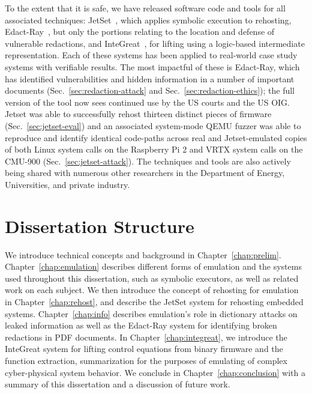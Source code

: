 To the extent that it is safe, we have released software code and tools for all associated techniques: JetSet~\cite{jetsetsource}, which applies symbolic execution to rehosting, Edact-Ray~\cite{deredactionsource}, but only the portions relating to the location and defense of vulnerable redactions, and InteGreat~\cite{bland2023integreat}, for lifting using a logic-based intermediate representation.
Each of these systems has been applied to real-world case study systems with verifiable results.
The most impactful of these is Edact-Ray, which has identified vulnerabilities and hidden information in a number of important documents (Sec.~\ref{sec:redaction-attack} and Sec.~\ref{sec:redaction-ethics}); the full version of the tool now sees continued use by the US courts and the US OIG.
Jetset was able to successfully rehost thirteen distinct pieces of firmware (Sec.~\ref{sec:jetset-eval}) and an associated system-mode QEMU fuzzer was able to reproduce and identify identical code-paths across real and Jetset-emulated copies of both Linux system calls on the Raspberry Pi 2 and VRTX system calls on the CMU-900 (Sec.~\ref{sec:jetset-attack}).
The techniques and tools are also actively being shared with numerous other researchers in the Department of Energy, Universities, and private industry.

\section{Dissertation Structure}

We introduce technical concepts and background in Chapter~\ref{chap:prelim}.
Chapter~\ref{chap:emulation} describes different forms of emulation and the systems used throughout this dissertation, such as symbolic executors, as well as related work on each subject.
We then introduce the concept of rehosting for emulation in Chapter~\ref{chap:rehost}, and describe the JetSet system for rehosting embedded systems.
Chapter~\ref{chap:info} describes emulation's role in dictionary attacks on leaked information as well as the Edact-Ray system for identifying broken redactions in PDF documents.
In Chapter~\ref{chap:integreat}, we introduce the InteGreat system for lifting control equations from binary firmware and the function extraction, summarization for the purposes of emulating of complex cyber-physical system behavior.
We conclude in Chapter~\ref{chap:conclusion} with a summary of this dissertation and a discussion of future work.
